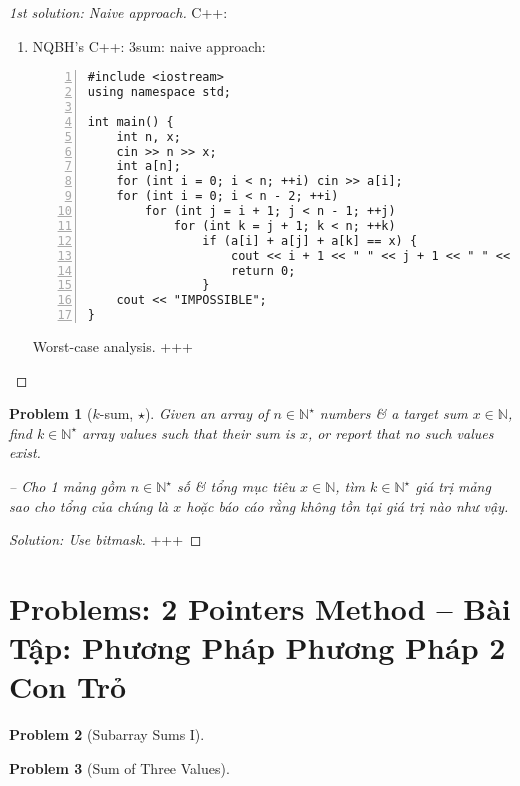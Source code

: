 \documentclass{article}
\newtheorem{problem}{Problem}
\begin{document}
\begin{proof}[1st solution: Naive approach]
    C++:
    \begin{enumerate}
        \item NQBH's C++: 3sum: naive approach:
        \begin{Verbatim}[numbers=left,xleftmargin=5mm]
#include <iostream>
using namespace std;

int main() {
    int n, x;
    cin >> n >> x;
    int a[n];
    for (int i = 0; i < n; ++i) cin >> a[i];
    for (int i = 0; i < n - 2; ++i)
        for (int j = i + 1; j < n - 1; ++j)
            for (int k = j + 1; k < n; ++k)
                if (a[i] + a[j] + a[k] == x) {
                    cout << i + 1 << " " << j + 1 << " " << k + 1;
                    return 0;
                }
    cout << "IMPOSSIBLE";
}
        \end{Verbatim}
        {\sf Worst-case analysis.} +++

    \end{enumerate}
\end{proof}

\begin{problem}[$k$-sum, $\star$]
    Given an array of $n\in\mathbb{N}^\star$ numbers \& a target sum $x\in\mathbb{N}$, find $k\in\mathbb{N}^\star$ array values such that their sum is $x$, or report that no such values exist.

    -- Cho 1 mảng gồm $n\in\mathbb{N}^\star$ số \& tổng mục tiêu $x\in\mathbb{N}$, tìm $k\in\mathbb{N}^\star$ giá trị mảng sao cho tổng của chúng là $x$ hoặc báo cáo rằng không tồn tại giá trị nào như vậy.
\end{problem}

\begin{proof}[Solution: Use bitmask]
    +++
\end{proof}


\section{Problems: 2 Pointers Method -- Bài Tập: Phương Pháp Phương Pháp 2 Con Trỏ}

\begin{problem}[Subarray Sums I]

\end{problem}

\begin{problem}[Sum of Three Values]

\end{problem}
\end{document}
